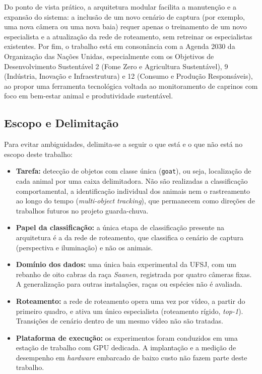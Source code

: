 \documentclass[12pt]{article}
\begin{document}
Do ponto de vista prático, a arquitetura modular facilita a manutenção e a expansão do sistema: a inclusão de um novo cenário de captura (por exemplo, uma nova câmera ou uma nova baia) requer apenas o treinamento de um novo especialista e a atualização da rede de roteamento, sem retreinar os especialistas existentes. Por fim, o trabalho está em consonância com a Agenda 2030 da Organização das Nações Unidas, especialmente com os Objetivos de Desenvolvimento Sustentável 2 (Fome Zero e Agricultura Sustentável), 9 (Indústria, Inovação e Infraestrutura) e 12 (Consumo e Produção Responsáveis), ao propor uma ferramenta tecnológica voltada ao monitoramento de caprinos com foco em bem-estar animal e produtividade sustentável.

\subsection{Escopo e Delimitação}
\label{subsec:escopo}

Para evitar ambiguidades, delimita-se a seguir o que está e o que não está no escopo deste trabalho:

\begin{itemize}
    \item \textbf{Tarefa:} detecção de objetos com classe única (\texttt{goat}), ou seja, localização de cada animal por uma caixa delimitadora. Não são realizadas a classificação comportamental, a identificação individual dos animais nem o rastreamento ao longo do tempo (\textit{multi-object tracking}), que permanecem como direções de trabalhos futuros no projeto guarda-chuva.
    \item \textbf{Papel da classificação:} a única etapa de classificação presente na arquitetura é a da rede de roteamento, que classifica o cenário de captura (perspectiva e iluminação) e não os animais.
    \item \textbf{Domínio dos dados:} uma única baia experimental da UFSJ, com um rebanho de oito cabras da raça \textit{Saanen}, registrada por quatro câmeras fixas. A generalização para outras instalações, raças ou espécies não é avaliada.
    \item \textbf{Roteamento:} a rede de roteamento opera uma vez por vídeo, a partir do primeiro quadro, e ativa um único especialista (roteamento rígido, \textit{top-1}). Transições de cenário dentro de um mesmo vídeo não são tratadas.
    \item \textbf{Plataforma de execução:} os experimentos foram conduzidos em uma estação de trabalho com GPU dedicada. A implantação e a medição de desempenho em \textit{hardware} embarcado de baixo custo não fazem parte deste trabalho.
\end{itemize}
\end{document}
